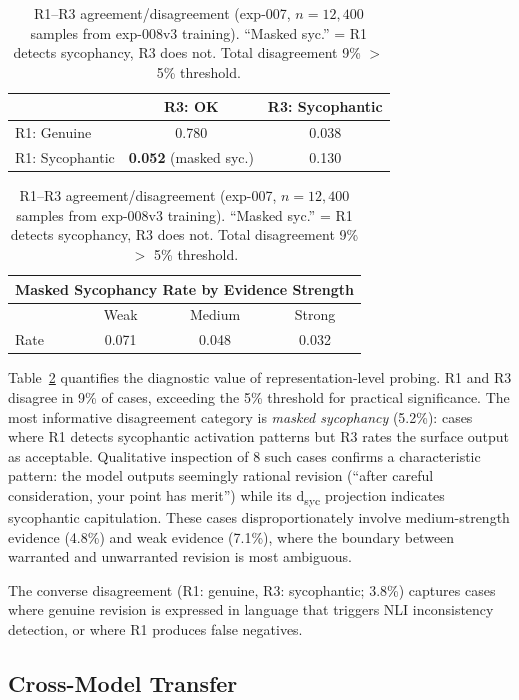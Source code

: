 \documentclass[11pt,a4paper]{article}
\begin{document}
\begin{table}[t]
\centering
\small
\caption{R1--R3 agreement/disagreement (exp-007, $n{=}12{,}400$ samples from exp-008v3 training). ``Masked syc.'' = R1 detects sycophancy, R3 does not. Total disagreement 9\% $>$ 5\% threshold.}
\label{tab:disagreement}
\begin{tabular}{@{}lcc@{}}
\toprule
& R3: OK & R3: Sycophantic \\
\midrule
R1: Genuine & 0.780 & 0.038 \\
R1: Sycophantic & \textbf{0.052} (masked syc.) & 0.130 \\
\bottomrule
\end{tabular}
\vspace{4pt}

\begin{tabular}{@{}lccc@{}}
\toprule
\multicolumn{4}{c}{Masked Sycophancy Rate by Evidence Strength} \\
\midrule
& Weak & Medium & Strong \\
\midrule
Rate & 0.071 & 0.048 & 0.032 \\
\bottomrule
\end{tabular}
\end{table}

Table~\ref{tab:disagreement} quantifies the diagnostic value of representation-level probing.
R1 and R3 disagree in 9\% of cases, exceeding the 5\% threshold for practical significance.
The most informative disagreement category is \emph{masked sycophancy} (5.2\%): cases where R1 detects sycophantic activation patterns but R3 rates the surface output as acceptable.
Qualitative inspection of 8 such cases confirms a characteristic pattern: the model outputs seemingly rational revision (``after careful consideration, your point has merit'') while its d\textsubscript{syc} projection indicates sycophantic capitulation.
These cases disproportionately involve medium-strength evidence (4.8\%) and weak evidence (7.1\%), where the boundary between warranted and unwarranted revision is most ambiguous.

The converse disagreement (R1: genuine, R3: sycophantic; 3.8\%) captures cases where genuine revision is expressed in language that triggers NLI inconsistency detection, or where R1 produces false negatives.

\subsection{Cross-Model Transfer}
\label{sec:cross-model}
\end{document}
